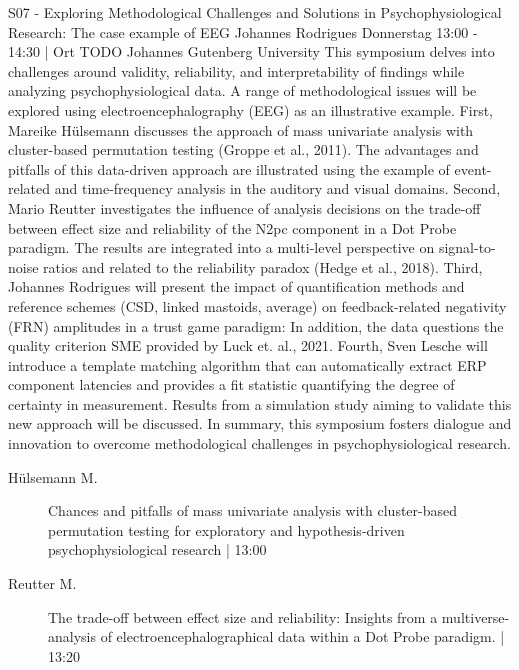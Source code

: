 
            \begin{symposium}
            {S07 - Exploring Methodological Challenges and Solutions in Psychophysiological Research: The case example of EEG}
            {Johannes Rodrigues}
            {Donnerstag 13:00 - 14:30 | Ort TODO}
            {Johannes Gutenberg University}
            This symposium delves into challenges around validity, reliability, and interpretability of findings while analyzing psychophysiological data. A range of methodological issues will be explored using electroencephalography (EEG) as an illustrative example.
First, Mareike Hülsemann discusses the approach of mass univariate analysis with cluster-based permutation testing (Groppe et al., 2011). The advantages and pitfalls of this data-driven approach are illustrated using the example of event-related and time-frequency analysis in the auditory and visual domains.
Second, Mario Reutter investigates the influence of analysis decisions on the trade-off between effect size and reliability of the N2pc component in a Dot Probe paradigm. The results are integrated into a multi-level perspective on signal-to-noise ratios and related to the reliability paradox (Hedge et al., 2018).
Third, Johannes Rodrigues will present the impact of quantification methods and reference schemes (CSD, linked mastoids, average) on feedback-related negativity (FRN) amplitudes in a trust game paradigm: In addition, the data questions the quality criterion SME provided by Luck et. al., 2021.
Fourth, Sven Lesche will introduce a template matching algorithm that can automatically extract ERP component latencies and provides a fit statistic quantifying the degree of certainty in measurement. Results from a simulation study aiming to validate this new approach will be discussed.
In summary, this symposium fosters dialogue and innovation to overcome methodological challenges in psychophysiological research.
            \begin{description}    
            
                \item [ Hülsemann M.] Chances and pitfalls of mass univariate analysis with cluster-based permutation testing for exploratory and hypothesis-driven psychophysiological research  \textcolor{mygray}{ | 13:00}    
                
                \item [ Reutter M.] The trade-off between effect size and reliability: Insights from a multiverse-analysis of electroencephalographical data within a Dot Probe paradigm. \textcolor{mygray}{ | 13:20}    
                

\end{description}
\end{symposium}
